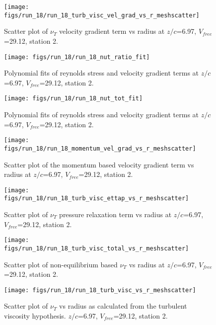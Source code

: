 \begin{figure}[H]
\centering
\texttt{[image: figs/run\_18/run\_18\_turb\_visc\_vel\_grad\_vs\_r\_meshscatter]}
\caption{Scatter plot of $\nu_T$ velocity gradient term vs radius at $z/c$=6.97, $V_{free}$=29.12, station 2.}
\end{figure}


\begin{figure}[H]
\centering
\texttt{[image: figs/run\_18/run\_18\_nut\_ratio\_fit]}
\caption{Polynomial fits of reynolds stress and velocity gradient terms at $z/c$=6.97, $V_{free}$=29.12, station 2.}
\end{figure}


\begin{figure}[H]
\centering
\texttt{[image: figs/run\_18/run\_18\_nut\_tot\_fit]}
\caption{Polynomial fits of reynolds stress and velocity gradient terms at $z/c$=6.97, $V_{free}$=29.12, station 2.}
\end{figure}


\begin{figure}[H]
\centering
\texttt{[image: figs/run\_18/run\_18\_momentum\_vel\_grad\_vs\_r\_meshscatter]}
\caption{Scatter plot of the momentum based velocity gradient term vs radius at $z/c$=6.97, $V_{free}$=29.12, station 2.}
\end{figure}


\begin{figure}[H]
\centering
\texttt{[image: figs/run\_18/run\_18\_turb\_visc\_ettap\_vs\_r\_meshscatter]}
\caption{Scatter plot of $\nu_T$ pressure relaxation term vs radius at $z/c$=6.97, $V_{free}$=29.12, station 2.}
\end{figure}


\begin{figure}[H]
\centering
\texttt{[image: figs/run\_18/run\_18\_turb\_visc\_total\_vs\_r\_meshscatter]}
\caption{Scatter plot of non-equilibrium based $\nu_T$ vs radius at $z/c$=6.97, $V_{free}$=29.12, station 2.}
\end{figure}


\begin{figure}[H]
\centering
\texttt{[image: figs/run\_18/run\_18\_turb\_visc\_vs\_r\_meshscatter]}
\caption{Scatter plot of $\nu_T$ vs radius as calculated from the turbulent viscosity hypothesis. $z/c$=6.97, $V_{free}$=29.12, station 2.}
\end{figure}


